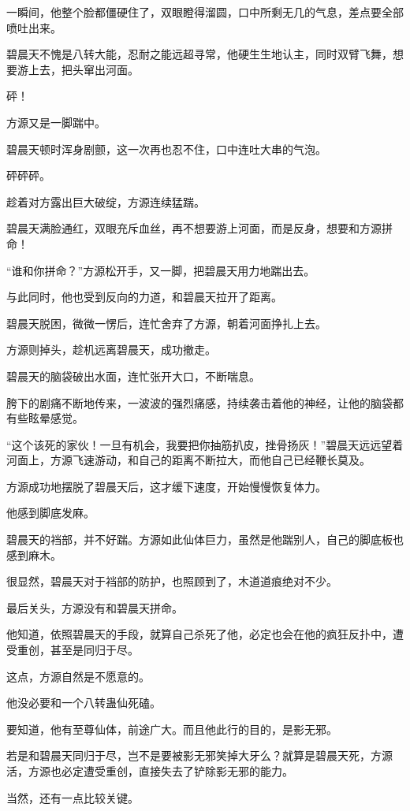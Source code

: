 \begin{this_body}
一瞬间，他整个脸都僵硬住了，双眼瞪得溜圆，口中所剩无几的气息，差点要全部喷吐出来。

碧晨天不愧是八转大能，忍耐之能远超寻常，他硬生生地认主，同时双臂飞舞，想要游上去，把头窜出河面。

砰！

方源又是一脚踹中。

碧晨天顿时浑身剧颤，这一次再也忍不住，口中连吐大串的气泡。

砰砰砰。

趁着对方露出巨大破绽，方源连续猛踹。

碧晨天满脸通红，双眼充斥血丝，再不想要游上河面，而是反身，想要和方源拼命！

“谁和你拼命？”方源松开手，又一脚，把碧晨天用力地踹出去。

与此同时，他也受到反向的力道，和碧晨天拉开了距离。

碧晨天脱困，微微一愣后，连忙舍弃了方源，朝着河面挣扎上去。

方源则掉头，趁机远离碧晨天，成功撤走。

碧晨天的脑袋破出水面，连忙张开大口，不断喘息。

胯下的剧痛不断地传来，一波波的强烈痛感，持续袭击着他的神经，让他的脑袋都有些眩晕感觉。

“这个该死的家伙！一旦有机会，我要把你抽筋扒皮，挫骨扬灰！”碧晨天远远望着河面上，方源飞速游动，和自己的距离不断拉大，而他自己已经鞭长莫及。

方源成功地摆脱了碧晨天后，这才缓下速度，开始慢慢恢复体力。

他感到脚底发麻。

碧晨天的裆部，并不好踹。方源如此仙体巨力，虽然是他踹别人，自己的脚底板也感到麻木。

很显然，碧晨天对于裆部的防护，也照顾到了，木道道痕绝对不少。

最后关头，方源没有和碧晨天拼命。

他知道，依照碧晨天的手段，就算自己杀死了他，必定也会在他的疯狂反扑中，遭受重创，甚至是同归于尽。

这点，方源自然是不愿意的。

他没必要和一个八转蛊仙死磕。

要知道，他有至尊仙体，前途广大。而且他此行的目的，是影无邪。

若是和碧晨天同归于尽，岂不是要被影无邪笑掉大牙么？就算是碧晨天死，方源活，方源也必定遭受重创，直接失去了铲除影无邪的能力。

当然，还有一点比较关键。


\end{this_body}
